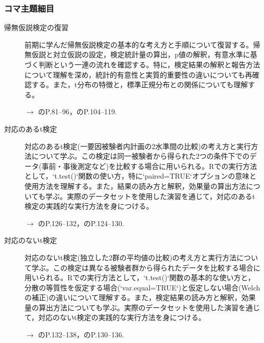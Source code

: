 \subsubsection{コマ主題細目}
\begin{description}
	\item[帰無仮説検定の復習] 前期に学んだ帰無仮説検定の基本的な考え方と手順について復習する。帰無仮説と対立仮説の設定，検定統計量の算出，p値の解釈，有意水準に基づく判断という一連の流れを確認する。特に，検定結果の解釈と報告方法について理解を深め，統計的有意性と実質的重要性の違いについても再確認する。また，t分布の特徴と，標準正規分布との関係についても理解する。
	      \begin{flushright}
		      $\to$ \textcite{Kawabata201408}のP.81--96，\textcite{Yamada2004}のP.104--119.
	      \end{flushright}

	\item[対応のあるt検定] 対応のあるt検定(一要因被験者内計画の2水準間の比較)の考え方と実行方法について学ぶ。この検定は同一被験者から得られた2つの条件下でのデータ(事前・事後測定など)を比較する場合に用いられる。Rでの実行方法として，`t.test()`関数の使い方，特に`paired=TRUE`オプションの意味と使用方法を理解する。また，結果の読み方と解釈，効果量の算出方法についても学ぶ。実際のデータセットを使用した演習を通じて，対応のあるt検定の実践的な実行方法を身につける。
	      \begin{flushright}
		      $\to$ \textcite{kosugi2019}のP.126--132，\textcite{Shimizu2021}のP.124--130.
	      \end{flushright}

	\item[対応のないt検定] 対応のないt検定(独立した2群の平均値の比較)の考え方と実行方法について学ぶ。この検定は異なる被験者群から得られたデータを比較する場合に用いられる。Rでの実行方法として，`t.test()`関数の基本的な使い方と，分散の等質性を仮定する場合(`var.equal=TRUE`)と仮定しない場合(Welchの補正)の違いについて理解する。また，検定結果の読み方と解釈，効果量の算出方法についても学ぶ。実際のデータセットを使用した演習を通じて，対応のないt検定の実践的な実行方法を身につける。
	      \begin{flushright}
		      $\to$ \textcite{kosugi2019}のP.132--138，\textcite{Shimizu2021}のP.130--136.
	      \end{flushright}



\end{description}
